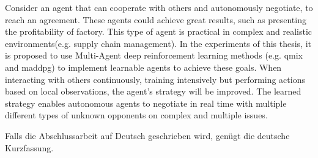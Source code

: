 
Consider an agent that can cooperate with others and autonomously negotiate, to reach an agreement. These agents could achieve great results, such as presenting the profitability of factory. This type of agent is practical in complex and realistic environments(e.g. supply chain management). In the experiments of this thesis, it is proposed to use Multi-Agent deep reinforcement learning methods (e.g. \gls{qmix} and \gls{maddpg}) to implement learnable agents to achieve these goals. When interacting with others continuously, training intensively but performing actions based on local observations, the agent’s strategy will be improved. The learned strategy enables autonomous agents to negotiate in real time with multiple different types of unknown opponents on complex and multiple issues.


Falls die Abschlussarbeit auf Deutsch geschrieben wird, genügt die deutsche Kurzfassung.
